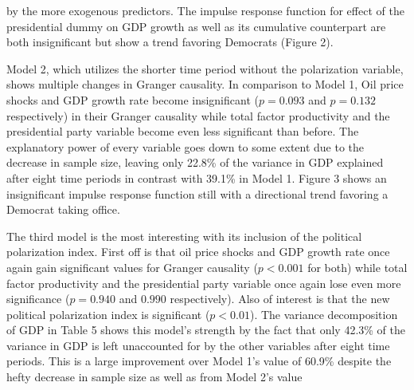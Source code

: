 \documentclass[a4paper, 12pt]{article}
\begin{document}
\noindent by the more exogenous predictors. The impulse response function for effect of the presidential dummy on GDP growth as well as its cumulative counterpart are both insignificant but show a trend favoring Democrats (Figure 2). \par

Model 2, which utilizes the shorter time period without the polarization variable, shows multiple changes in Granger causality. In comparison to Model 1, Oil price shocks and GDP growth rate become insignificant ($p = 0.093$ and $p = 0.132$ respectively) in their Granger causality while total factor productivity and the presidential party variable become even less significant than before. The explanatory power of every variable goes down to some extent due to the decrease in sample size, leaving only 22.8\% of the variance in GDP explained after eight time periods in contrast with 39.1\% in Model 1. Figure 3 shows an insignificant impulse response function still with a directional trend favoring a Democrat taking office. \par 

The third model is the most interesting with its inclusion of the political polarization index. First off is that oil price shocks and GDP growth rate once again gain significant values for Granger causality ($p < 0.001$ for both) while total factor productivity and the presidential party variable once again lose even more significance ($p = 0.940$ and $0.990$ respectively). Also of interest is that the new political polarization index is significant ($p < 0.01$). The variance decomposition of GDP in Table 5 shows this model's strength by the fact that only 42.3\% of the variance in GDP is left unaccounted for by the other variables after eight time periods. This is a large improvement over Model 1's value of 60.9\% despite the hefty decrease in sample size as well as from Model 2's value \par  
\end{document}
